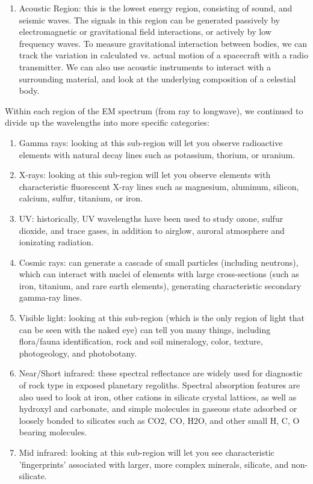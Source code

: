 \documentclass[a4, 12 pt]{article} %
\begin{document}
\begin{enumerate}
\item Acoustic Region: this is the lowest energy region, consisting of sound, and seismic waves. The signals in this region can be generated passively by electromagnetic or gravitational field interactions, or actively by low frequency waves. To measure gravitational interaction between bodies, we can track the variation in calculated vs. actual motion of a spacecraft with a radio transmitter. We can also use acoustic instruments to interact with a surrounding material, and look at the underlying composition of a celestial body.
\end{enumerate}
Within each region of the EM spectrum (from ray to longwave), we continued to divide up the wavelengths into more specific categories:
\begin{enumerate}
\item Gamma rays: looking at this sub-region will let you observe radioactive elements with natural decay lines such as potassium, thorium, or uranium. 
\item X-rays: looking at this sub-region will let you observe elements with characteristic fluorescent X-ray lines such as magnesium, aluminum, silicon, calcium, sulfur, titanium, or iron. 
\item UV: historically, UV wavelengths have been used to study ozone, sulfur dioxide, and trace gases, in addition to airglow, auroral atmosphere and ionizating radiation. 
\item Cosmic rays: can generate a cascade of small particles (including neutrons), which can interact with nuclei of elements with large cross-sections (such as iron, titanium, and rare earth elements), generating characteristic secondary gamma-ray lines. 
\item Visible light: looking at this sub-region (which is the only region of light that can be seen with the naked eye) can tell you many things, including flora/fauna identification, rock and soil mineralogy, color, texture, photogeology, and photobotany.
\item Near/Short infrared: these spectral reflectance are widely used for diagnostic of rock type in exposed planetary regoliths. Spectral absorption features are also used to look at iron, other cations in silicate crystal lattices, as well as hydroxyl and carbonate, and simple molecules in gaseous state adsorbed or loosely bonded to silicates such as CO2, CO, H2O, and other small H, C, O bearing molecules. 
\item Mid infrared: looking at this sub-region will let you see characteristic 'fingerprints' associated with larger, more complex minerals, silicate, and non-silicate.

\end{enumerate}
\end{document}
